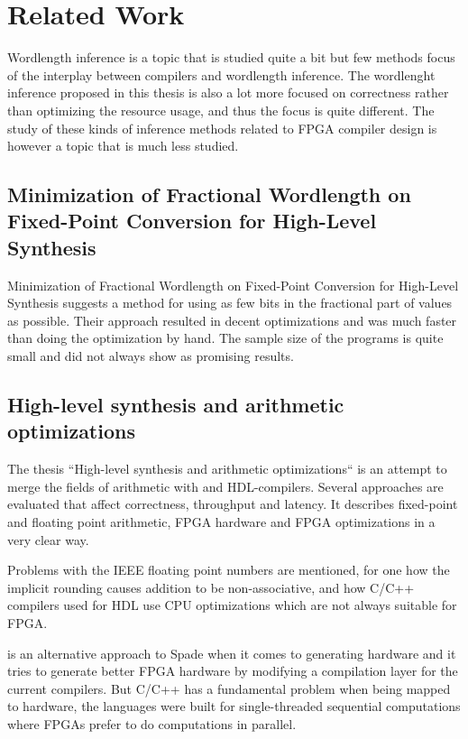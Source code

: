 \chapter{Related Work}
Wordlength inference is a topic that is studied quite a bit but few methods focus of the interplay between compilers and wordlength inference. The wordlenght inference proposed in this thesis is also a lot more focused on correctness rather than optimizing the resource usage, and thus the focus is quite different. The study of these kinds of inference methods related to FPGA compiler design is however a topic that is much less studied.

\section{Minimization of Fractional Wordlength on Fixed-Point Conversion for High-Level Synthesis}
Minimization of Fractional Wordlength on Fixed-Point Conversion for High-Level Synthesis suggests a method for using as few bits in the fractional part of values as possible. Their approach resulted in decent optimizations and was much faster than doing the optimization by hand. The sample size of the programs is quite small and did not always show as promising results. \cite{src:MinOfFrac}

\section{High-level synthesis and arithmetic optimizations}
The thesis ``High-level synthesis and arithmetic optimizations`` is an attempt to merge the fields of arithmetic with and HDL-compilers. Several approaches are evaluated that affect correctness, throughput and latency. It describes fixed-point and floating point arithmetic, FPGA hardware and FPGA optimizations in a very clear way.

Problems with the IEEE floating point numbers are mentioned, for one how the implicit rounding causes addition to be non-associative, and how C/C++ compilers used for HDL use CPU optimizations which are not always suitable for FPGA.

\citeauthor{src:HLSandOpt} is an alternative approach to Spade when it comes to generating hardware and it tries to generate better FPGA hardware by modifying a compilation layer for the current compilers. But C/C++ has a fundamental problem when being mapped to hardware, the languages were built for single-threaded sequential computations where FPGAs prefer to do computations in parallel. \cite{src:HLSandOpt}

